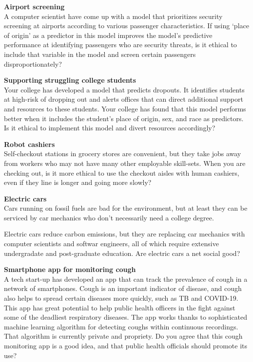 \documentclass[
]{book}
\begin{document}
\textbf{Airport screening}\\
A computer scientist have come up with a model that prioritizes security screening at airports according to various passenger characteristics. If using `place of origin' as a predictor in this model improves the model's predictive performance at identifying passengers who are security threats, is it ethical to include that variable in the model and screen certain passengers disproportionately?

\textbf{Supporting struggling college students}\\
Your college has developed a model that predicts dropouts. It identifies students at high-risk of dropping out and alerts offices that can direct additional support and resources to these students. Your college has found that this model performs better when it includes the student's place of origin, sex, and race as predictors. Is it ethical to implement this model and divert resources accordingly?

\textbf{Robot cashiers}\\
Self-checkout stations in grocery stores are convenient, but they take jobs away from workers who may not have many other employable skill-sets. When you are checking out, is it more ethical to use the checkout aisles with human cashiers, even if they line is longer and going more slowly?

\textbf{Electric cars}\\
Cars running on fossil fuels are bad for the environment, but at least they can be serviced by car mechanics who don't necessarily need a college degree.

Electric cars reduce carbon emissions, but they are replacing car mechanics with computer scientists and softwar engineers, all of which require extensive undergradate and post-graduate education. Are electric cars a net social good?

\textbf{Smartphone app for monitoring cough}\\
A tech start-up has developed an app that can track the prevalence of cough in a network of smartphones. Cough is an important indicator of disease, and cough also helps to spread certain diseases more quickly, such as TB and COVID-19. This app has great potential to help public health officers in the fight against some of the deadliest respiratory diseases. The app works thanks to sophisticated machine learning algorithm for detecting coughs within continuous recordings. That algorithm is currently private and propriety. Do you agree that this cough monitoring app is a good idea, and that public health officials should promote its use?
\end{document}
